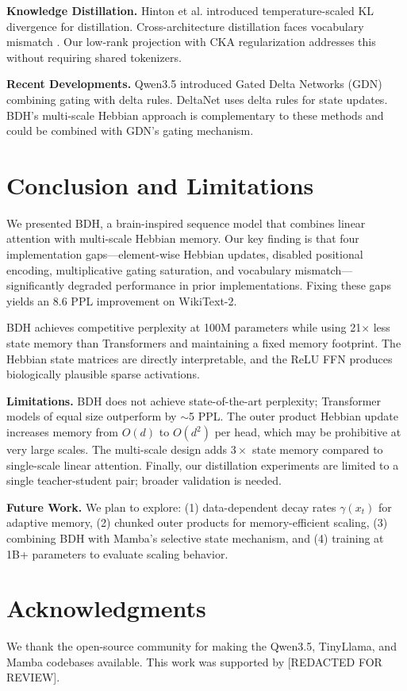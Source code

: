 \documentclass{article}
\begin{document}
\textbf{Knowledge Distillation.} Hinton et al. \citep{hinton2015distilling} introduced temperature-scaled KL divergence for distillation. Cross-architecture distillation faces vocabulary mismatch \citep{kim2023sequence}. Our low-rank projection with CKA regularization addresses this without requiring shared tokenizers.

\textbf{Recent Developments.} Qwen3.5 \citep{qwen2025qwen35} introduced Gated Delta Networks (GDN) combining gating with delta rules. DeltaNet \citep{schmidhuber2023deltanet} uses delta rules for state updates. BDH's multi-scale Hebbian approach is complementary to these methods and could be combined with GDN's gating mechanism.

\section{Conclusion and Limitations}

We presented BDH, a brain-inspired sequence model that combines linear attention with multi-scale Hebbian memory. Our key finding is that four implementation gaps---element-wise Hebbian updates, disabled positional encoding, multiplicative gating saturation, and vocabulary mismatch---significantly degraded performance in prior implementations. Fixing these gaps yields an 8.6 PPL improvement on WikiText-2.

BDH achieves competitive perplexity at 100M parameters while using 21$\times$ less state memory than Transformers and maintaining a fixed memory footprint. The Hebbian state matrices are directly interpretable, and the ReLU FFN produces biologically plausible sparse activations.

\textbf{Limitations.} BDH does not achieve state-of-the-art perplexity; Transformer models of equal size outperform by $\sim$5 PPL. The outer product Hebbian update increases memory from $O(d)$ to $O(d^2)$ per head, which may be prohibitive at very large scales. The multi-scale design adds $3\times$ state memory compared to single-scale linear attention. Finally, our distillation experiments are limited to a single teacher-student pair; broader validation is needed.

\textbf{Future Work.} We plan to explore: (1) data-dependent decay rates $\gamma(x_t)$ for adaptive memory, (2) chunked outer products for memory-efficient scaling, (3) combining BDH with Mamba's selective state mechanism, and (4) training at 1B+ parameters to evaluate scaling behavior.

\section*{Acknowledgments}

We thank the open-source community for making the Qwen3.5, TinyLlama, and Mamba codebases available. This work was supported by [REDACTED FOR REVIEW].



\end{document}
